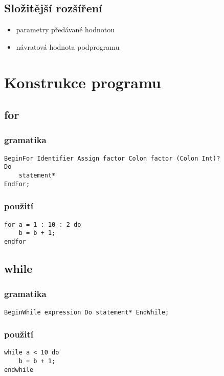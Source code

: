 \documentclass{style}
\begin{document}
\subsection{Složitější rozšíření}
\begin{itemize}
\item parametry předávané hodnotou \\
\item návratová hodnota podprogramu \\
\end{itemize}

\section{Konstrukce programu}
\subsection{for}
\subsubsection{gramatika}
\begin{lstlisting}
BeginFor Identifier Assign factor Colon factor (Colon Int)?
Do
	statement*
EndFor;
\end{lstlisting}

\subsubsection{použití}
\begin{lstlisting}
for a = 1 : 10 : 2 do
	b = b + 1;
endfor
\end{lstlisting}

\subsection{while}
\subsubsection{gramatika}
\begin{lstlisting}
BeginWhile expression Do statement* EndWhile;
\end{lstlisting}

\subsubsection{použití}
\begin{lstlisting}
while a < 10 do
	b = b + 1;
endwhile
\end{lstlisting}
\end{document}
